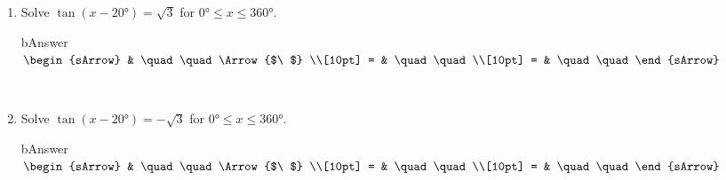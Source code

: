 \clearpage\noindent%
\begin{enumerate}[resume]
  \item Solve $\tan{(x-20\si{\degree})}=\sqrt{3}$ for $  0\si{\degree} \leqslant x \leqslant 360\si{\degree}$.
      \begin{envOut}[equal height group=A-Rev-1]{bAnswer}
	       $\begin{sArrow}
	             & \quad\quad       \Arrow{$\ $} \\[10pt]
               = & \quad\quad               \\[10pt]      
			   = & \quad\quad  
	        \end{sArrow}$
      \end{envOut}
	  \begin{shortsolution}  
	     $ \quad \quad \quad \quad$
 	  \end{shortsolution}

  \item Solve $\tan{(x-20\si{\degree})}=-\sqrt{3}$ for $  0\si{\degree} \leqslant x \leqslant 360\si{\degree}$.
      \begin{envOut}[equal height group=A-Rev-1]{bAnswer}
	       $\begin{sArrow}
	             & \quad\quad       \Arrow{$\ $} \\[10pt]
               = & \quad\quad               \\[10pt]      
			   = & \quad\quad  
	        \end{sArrow}$
      \end{envOut}
	  \begin{shortsolution}  
	     $ \quad \quad \quad \quad$
 	  \end{shortsolution}
\end{enumerate}

